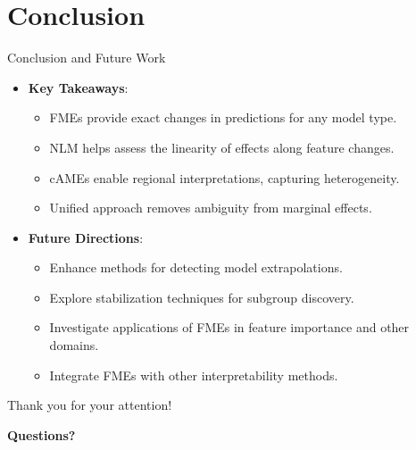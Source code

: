 \documentclass[11pt,compress,t,notes=noshow, aspectratio=169, xcolor=table]{beamer}
\begin{document}
\section{Conclusion}

\begin{frame}{Conclusion and Future Work}
\begin{itemize}
\item \textbf{Key Takeaways}:
\begin{itemize}
  \item FMEs provide exact changes in predictions for any model type.
  \item NLM helps assess the linearity of effects along feature changes.
  \item cAMEs enable regional interpretations, capturing heterogeneity.
  \item Unified approach removes ambiguity from marginal effects.
\end{itemize}
\item \textbf{Future Directions}:
\begin{itemize}
  \item Enhance methods for detecting model extrapolations.
  \item Explore stabilization techniques for subgroup discovery.
  \item Investigate applications of FMEs in feature importance and other domains.
  \item Integrate FMEs with other interpretability methods.
\end{itemize}
\end{itemize}
\end{frame}

\begin{frame}
  \centering
  \Large{Thank you for your attention!}
  \vspace{1cm}
  
  \normalsize
  \textbf{Questions?}
\end{frame}

% 
% 

\endlecture
\end{document}
